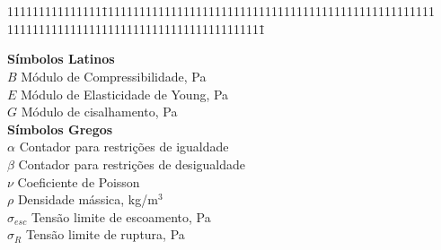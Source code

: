 \chapter*{\hfill \losname \hfill}

\begin{tabbing}
111111111111111\=11111111111111111111111111111111111111111111111111111
11111111111111111111111111111111111111111\=\kill

\textbf{Símbolos Latinos}\\

$B$ \>  Módulo de Compressibilidade, Pa \\

$E$ \>  Módulo de Elasticidade de Young, Pa \\

$G$  \>  Módulo de cisalhamento, Pa \\


\textbf{Símbolos Gregos}\\

$\alpha$ \>  Contador para restrições de igualdade \\

$\beta$   \>  Contador para restrições de desigualdade \\

$\nu$   \>  Coeficiente de Poisson \\

$\rho$   \>  Densidade mássica, kg/m$^3$ \\

$\sigma_{esc}$   \>  Tensão limite de escoamento, Pa \\

$\sigma_{R}$   \>  Tensão limite de ruptura, Pa \\

\end{tabbing}